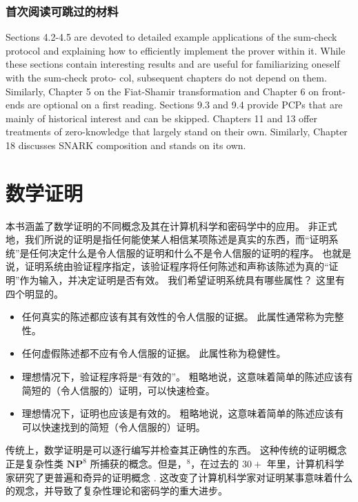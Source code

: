 \subsubsection{首次阅读可跳过的材料} Sections 4.2-4.5 are devoted to detailed example applications of the sum-check protocol and explaining how to efficiently implement the prover within it. While these sections contain interesting results and are useful for familiarizing oneself with the sum-check proto- col, subsequent chapters do not depend on them. Similarly, Chapter 5 on the Fiat-Shamir transformation and Chapter 6 on front-ends are optional on a first reading. Sections 9.3 and 9.4 provide PCPs that are mainly of historical interest and can be skipped.
Chapters 11 and 13 offer treatments of zero-knowledge that largely stand on their own. Similarly, Chapter 18 discusses SNARK composition and stands on its own.



\section{数学证明}
本书涵盖了数学证明的不同概念及其在计算机科学和密码学中的应用。 非正式地，我们所说的证明是指任何能使某人相信某项陈述是真实的东西，而“证明系统”是任何决定什么是令人信服的证明和什么不是令人信服的证明的程序。 也就是说，证明系统由验证程序指定，该验证程序将任何陈述和声称该陈述为真的“证明”作为输入，并决定证明是否有效。
我们希望证明系统具有哪些属性？ 这里有四个明显的。
\begin{itemize}
    \item 任何真实的陈述都应该有其有效性的令人信服的证据。 此属性通常称为完整性。
    \item 任何虚假陈述都不应有令人信服的证据。 此属性称为稳健性。
    \item 理想情况下，验证程序将是“有效的”。 粗略地说，这意味着简单的陈述应该有简短的（令人信服的）证明，可以快速检查。
    \item 理想情况下，证明也应该是有效的。 粗略地说，这意味着简单的陈述应该有可以快速找到的简短（令人信服的）证明。
\end{itemize}


传统上，数学证明是可以逐行编写并检查其正确性的东西。 这种传统的证明概念正是复杂性类 $\mathbf{N P}^8$ 所捕获的概念。但是，$^8$，在过去的 $30+$ 年里，计算机科学家研究了更普遍和奇异的证明概念 . 这改变了计算机科学家对证明某事意味着什么的观念，并导致了复杂性理论和密码学的重大进步。

